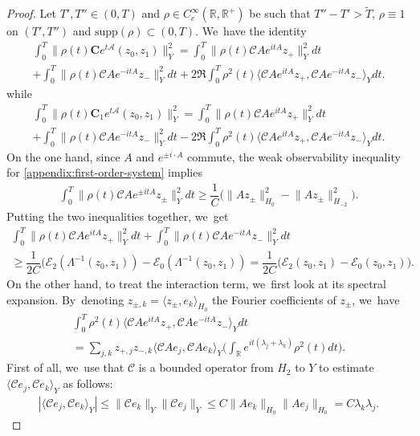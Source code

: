 \documentclass[10pt]{amsart}
\theoremstyle{definition}
\let\mc\mathcal
\let\ld\lambda
\newcommand{\A}{\mc{A}}
\newcommand{\E}{\mc{E}}
\newcommand{\R}{\mathbb{R}}
\newcommand{\bC}{\boldsymbol{C}}
\providecommand{\norm}[1]{\lVert#1\rVert}
\providecommand{\inn}[1]{\langle#1\rangle}
\begin{document}
\begin{proof}
Let $T',T'' \in (0,T)$ and $\rho \in C^\infty_c(\mathbb{R},\mathbb{R}^+)$
be such that $T''-T'>\widetilde{T}$, $\rho \equiv 1$ on $(T',T'')$ and $\text{supp}(\rho) \subset (0,T)$. We~have the identity
\begin{multline*}
\int_0^T \norm{\rho(t)\bC e^{t\A}(z_0, z_1)}_{Y}^2=\int_0^T \norm{\rho(t)\mc{C}Ae^{itA}z_+}_{Y}^2dt\\+\int_0^T \norm{\rho(t)\mc{C}Ae^{-itA}z_-}_{Y}^2dt+2\Re\int_0^T \rho^2(t)\inn{\mc{C}Ae^{itA}z_+, \mc{C}Ae^{-itA}z_-}_{Y}dt.
\end{multline*}
while
\begin{multline*}
\int_0^T \norm{\rho(t)\bC_1 e^{t\A}(z_0, z_1)}_{Y}^2=\int_0^T \norm{\rho(t)\mc{C}Ae^{itA}z_+}_{Y}^2dt\\+\int_0^T \norm{\rho(t)\mc{C}Ae^{-itA}z_-}_{Y}^2dt-2\Re\int_0^T \rho^2(t)\inn{\mc{C}Ae^{itA}z_+, \mc{C}Ae^{-itA}z_-}_{Y}dt.
\end{multline*}
On the one hand, since $A$ and $e^{\pm i\cdot A}$ commute, the weak observability inequality for \eqref{appendix:first-order-system} implies
\begin{align*}
\int_0^T \norm{\rho(t)\mc{C}Ae^{\pm itA}z_{\pm}}_{Y}^2dt\geq \dfrac{1}{C}\big(\norm{Az_\pm}_{H_0}^2-\norm{Az_\pm}_{H_{-2}}^2\big).
\end{align*}
Putting the two inequalities together, we~get
\begin{multline*}
\int_0^T \norm{\rho(t)\mc{C}Ae^{itA}z_+}_{Y}^2dt+\int_0^T \norm{\rho(t)\mc{C}Ae^{-itA}z_-}_{Y}^2dt\\
\geq \dfrac{1}{2C}\big(\E_2(\Lambda^{-1}(z_0, z_1))-\E_{0}(\Lambda^{-1}(z_0, z_1))=\dfrac{1}{2C}\big(\E_2(z_0, z_1)-\E_{0}(z_0, z_1)\big).
\end{multline*}
On the other hand, to treat the interaction term, we~first look at its spectral expansion. By~denoting $z_{\pm, k}=\inn{z_{\pm}, e_k}_{H_0}$ the Fourier coefficients of $z_{\pm}$, we~have
\begin{multline*}
\int_0^T \rho^2(t)\inn{\mc{C}Ae^{itA}z_+, \mc{C}Ae^{-itA}z_-}_{Y}dt\\[-5pt]
=\sum_{j, k} z_{+, j}z_{-, k} \inn{\mc{C}Ae_j, \mc{C}Ae_k}_{Y} \biggl(\int_\R e^{it(\ld_j+\ld_k)}\rho^2(t)dt\biggr).
\end{multline*}
First of all, we~use that $\mc{C}$ is a bounded operator from $H_2$ to $Y$ to estimate $\inn{\mc{C}e_j, \mc{C}e_k}_{Y}$ as follows:
\begin{align*}
|\inn{\mc{C}e_j, \mc{C}e_k}_{Y}|\leq \norm{\mc{C}e_k}_{Y}\norm{\mc{C}e_j}_{Y}\leq C\norm{Ae_k}_{H_0}\norm{Ae_j}_{H_0}=C\ld_k\ld_j.

\end{align*}
\end{proof}
\end{document}
